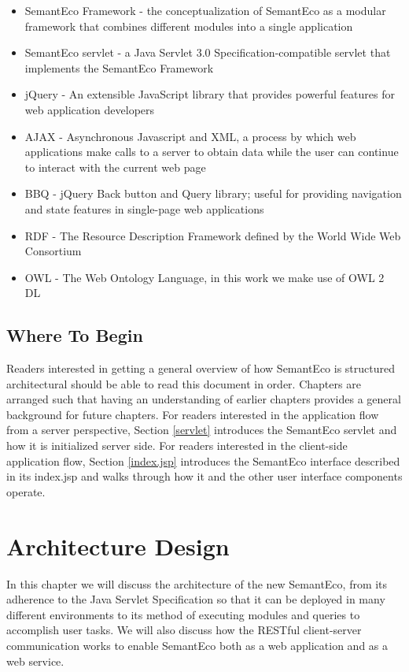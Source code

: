 \documentclass[letterpaper]{report}
\begin{document}
\begin{itemize}
\item SemantEco Framework - the conceptualization of SemantEco as a modular framework that combines different modules into a single application
\item SemantEco servlet - a Java Servlet 3.0 Specification-compatible servlet that implements the SemantEco Framework
\item jQuery - An extensible JavaScript library that provides powerful features for web application developers
\item AJAX - Asynchronous Javascript and XML, a process by which web applications make calls to a server to obtain data while the user can continue to interact with the current web page
\item BBQ - jQuery Back button and Query library; useful for providing navigation and state features in single-page web applications
\item RDF - The Resource Description Framework defined by the World Wide Web Consortium
\item OWL - The Web Ontology Language, in this work we make use of OWL 2 DL
\end{itemize}

\section{Where To Begin}
Readers interested in getting a general overview of how SemantEco is structured architectural should be able to read this document in order. Chapters are arranged such that having an understanding of earlier chapters provides a general background for future chapters. For readers interested in the application flow from a server perspective, Section \ref{servlet} introduces the SemantEco servlet and how it is initialized server side. For readers interested in the client-side application flow, Section \ref{index.jsp} introduces the SemantEco interface described in its index.jsp and walks through how it and the other user interface components operate.

\chapter{Architecture Design}
\label{architecture}
In this chapter we will discuss the architecture of the new SemantEco, from its adherence to the Java Servlet Specification so that it can be deployed in many different environments to its method of executing modules and queries to accomplish user tasks. We will also discuss how the RESTful client-server communication works to enable SemantEco both as a web application and as a web service.
\end{document}
